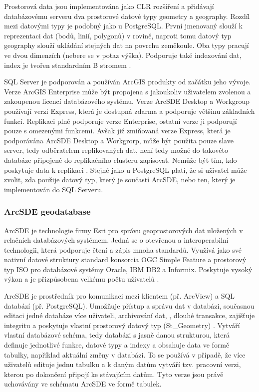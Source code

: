 Prostorová data jsou implementována jako CLR rozšíření a přidávají databázovému serveru dva prostorové datové typy geometry a geography. Rozdíl mezi datovými typy je podobný jako u PostgreSQL. První jmenovaný slouží k reprezentaci dat (bodů, linií, polygonů) v rovině, naproti tomu datový typ geography slouží ukládání stejných dat na povrchu zeměkoule. Oba typy pracují ve dvou dimenzích (nebere se v potaz výška). Podporuje také indexování dat, index je tvořen standardním B stromem \citep{Cincura2009}.

SQL Server je podporován a používán ArcGIS produkty od začátku jeho vývoje. Verze ArcGIS Enterprise může být propojena s jakoukoliv uživatelem zvolenou a zakoupenou licencí databázového systému. Verze ArcSDE Desktop a Workgroup používají verzi Express, která je dostupná zdarma a podporuje většinu základních funkcí. Replikaci plně podporuje verze Enterprise, ostatní verze ji podporují pouze s omezenými funkcemi. Avšak již zmiňovaná verze Express, která je podporávána ArcSDE Desktop a Workgrorp, může být použita pouze slave server, tedy odběratelem replikovaných dat, není tedy možné do takovéto databáze připojené do replikačního clusteru zapisovat. Nemůže být tím, kdo poskytuje data k replikaci \citep{Whalen2008}. Stejně jako u PostgreSQL platí, že si uživatel může zvolit, zda použije datový typ, který je součastí ArcSDE, nebo ten, který je implementován do SQL Serveru.

        \subsubsection{ArcSDE geodatabase}
        \label{kArcSDE}
ArcSDE je technologie firmy Esri pro správu geoprostorových dat uložených v relačních databázových systémem. Jedná se o otevřenou a interoperabilní technologii, která podporuje čtení a zápis mnoha standardů. Využívá jako své nativní datové struktury standard konsorcia OGC Simple Feature a prostorový typ ISO pro databázové systémy Oracle, IBM DB2 a Informix. Poskytuje vysoký výkon a je přizpůsobena velkému počtu uživatelů \citep{Esri2006}.

ArcSDE je prostředník pro komunikaci mezi klientem (př. ArcView) a SQL databází (př. PostgreSQL). Umožňuje přístup a správu dat v databázi, současnou editaci jedné databáze více uživateli, archivování  dat, , dlouhé transakce, zajišťuje integritu a poskytuje vlastní prostorový datový typ (St\_Geometry) \citep{Law2008}. 
Vytváří vlastní databázové schéma, tedy databázi s jasně danou strukturou, která definuje jednotlivé funkce, datové typy a indexy a obsahuje data ve formě tabulky, například aktuální změny v databázi. To se používá v případě, že více uživatelů edituje jednu tabulku a k daným datům vytváří tzv. pracovní verzi, kterou po dokončení připojí ke stávajícím datům. Tyto verze jsou právě uchovávány ve schématu ArcSDE ve formě tabulek. 

